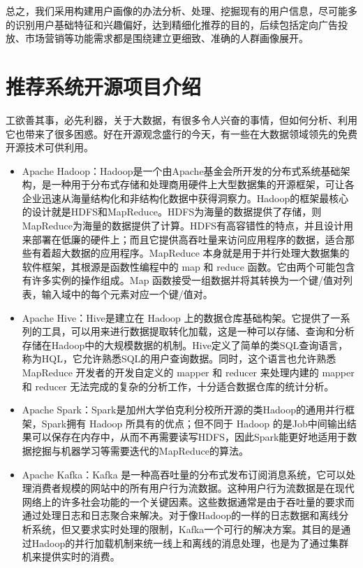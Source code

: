 	总之，我们采用构建用户画像的办法分析、处理、挖掘现有的用户信息，尽可能多的识别用户基础特征和兴趣偏好，达到精细化推荐的目的，后续包括定向广告投放、市场营销等功能需求都是围绕建立更细致、准确的人群画像展开。
\section{推荐系统开源项目介绍}
工欲善其事，必先利器，关于大数据，有很多令人兴奋的事情，但如何分析、利用它也带来了很多困惑。好在开源观念盛行的今天，有一些在大数据领域领先的免费开源技术可供利用。
\begin{itemize}
	\item Apache Hadoop：Hadoop是一个由Apache基金会所开发的分布式系统基础架构，是一种用于分布式存储和处理商用硬件上大型数据集的开源框架，可让各企业迅速从海量结构化和非结构化数据中获得洞察力。Hadoop的框架最核心的设计就是HDFS和MapReduce。HDFS为海量的数据提供了存储，则MapReduce为海量的数据提供了计算。HDFS有高容错性的特点，并且设计用来部署在低廉的硬件上；而且它提供高吞吐量来访问应用程序的数据，适合那些有着超大数据的应用程序。MapReduce 本身就是用于并行处理大数据集的软件框架，其根源是函数性编程中的 map 和 reduce 函数。它由两个可能包含有许多实例的操作组成。Map 函数接受一组数据并将其转换为一个键/值对列表，输入域中的每个元素对应一个键/值对。
	\item Apache Hive：Hive是建立在 Hadoop 上的数据仓库基础构架。它提供了一系列的工具，可以用来进行数据提取转化加载，这是一种可以存储、查询和分析存储在Hadoop中的大规模数据的机制。Hive定义了简单的类SQL查询语言，称为HQL，它允许熟悉SQL的用户查询数据。同时，这个语言也允许熟悉 MapReduce 开发者的开发自定义的 mapper 和 reducer 来处理内建的 mapper 和 reducer 无法完成的复杂的分析工作，十分适合数据仓库的统计分析。
	\item Apache Spark：Spark是加州大学伯克利分校所开源的类Hadoop的通用并行框架，Spark拥有 Hadoop 所具有的优点；但不同于 Hadoop 的是Job中间输出结果可以保存在内存中，从而不再需要读写HDFS，因此Spark能更好地适用于数据挖掘与机器学习等需要迭代的MapReduce的算法。
	\item Apache Kafka：Kafka 是一种高吞吐量的分布式发布订阅消息系统，它可以处理消费者规模的网站中的所有用户行为流数据。这种用户行为流数据是在现代网络上的许多社会功能的一个关键因素。这些数据通常是由于吞吐量的要求而通过处理日志和日志聚合来解决。对于像Hadoop的一样的日志数据和离线分析系统，但又要求实时处理的限制，Kafka一个可行的解决方案。其目的是通过Hadoop的并行加载机制来统一线上和离线的消息处理，也是为了通过集群机来提供实时的消费。
\end{itemize}

